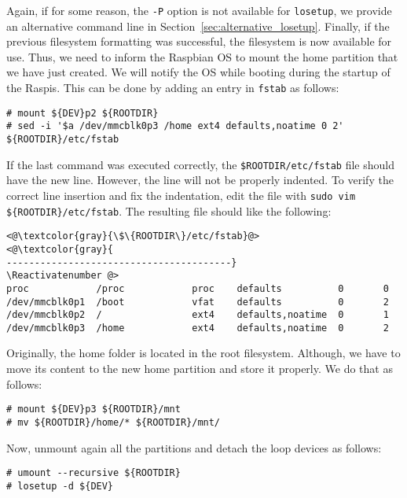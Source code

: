 Again, if for some reason, the \texttt{-P} option is not available for
\texttt{losetup}, we provide an alternative command line in
Section~\ref{sec:alternative_losetup}. Finally, if the previous filesystem
formatting was successful, the filesystem is now available for use. Thus,
we need to inform the Raspbian \ac{OS} to mount the home partition
that we have just created. We will notify the \ac{OS} while
booting during the startup of the \ac{Raspi}s. This can be done by adding
an entry in \texttt{fstab} as follows:

\begin{lstlisting}[]
# mount ${DEV}p2 ${ROOTDIR}
# sed -i '$a /dev/mmcblk0p3 /home ext4 defaults,noatime 0 2' ${ROOTDIR}/etc/fstab
\end{lstlisting}
\FloatBarrier
\vspace{-5mm}

If the last command was executed correctly, the
\texttt{\${ROOTDIR}/etc/fstab} file should have the new line. However,
the line will not be properly indented. To verify the correct line
insertion and fix the indentation, edit the file with
\texttt{sudo vim \$\{ROOTDIR\}/etc/fstab}. The resulting file should like
the following:

\begin{lstlisting}[]
<@\textcolor{gray}{\$\{ROOTDIR\}/etc/fstab}@>
<@\textcolor{gray}{
----------------------------------------}
\Reactivatenumber @>
proc            /proc            proc    defaults          0       0
/dev/mmcblk0p1  /boot            vfat    defaults          0       2
/dev/mmcblk0p2  /                ext4    defaults,noatime  0       1
/dev/mmcblk0p3  /home            ext4    defaults,noatime  0       2
\end{lstlisting}
\FloatBarrier
\vspace{-5mm}

Originally, the home folder is located in the root filesystem. Although,
we have to move its content to the new home partition and store it properly.
We do that as follows:

\begin{lstlisting}[]
# mount ${DEV}p3 ${ROOTDIR}/mnt
# mv ${ROOTDIR}/home/* ${ROOTDIR}/mnt/
\end{lstlisting}
\FloatBarrier
\vspace{-5mm}

Now, unmount again all the partitions and detach the loop devices as follows:
\begin{lstlisting}[]
# umount --recursive ${ROOTDIR}
# losetup -d ${DEV}
\end{lstlisting}
\FloatBarrier
\vspace{-5mm}

